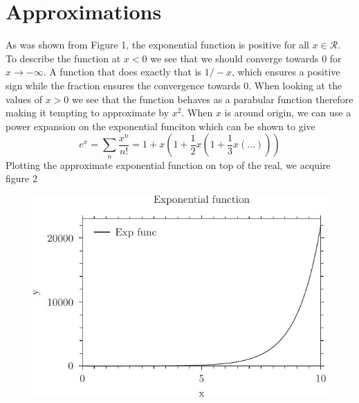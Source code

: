 \documentclass{article}
\begin{document}
\section{Approximations}
As was shown from Figure 1, the exponential function is positive for all $x\in \mathcal{R}$. To describe the function at $x<0$ we see that we should converge towards 0 for $x\rightarrow -\infty$. A function that does exactly that is $1/-x$, which ensures a positive sign while the fraction ensures the convergence towards 0. \newline
When looking at the values of $x>0$ we see that the function behaves as a parabular function therefore making it tempting to approximate by $x^2$.
\newline
When $x$ is around origin, we can use a power expansion on the exponential funciton which can be shown to give
\begin{equation}
	e^x=\sum_n \frac{x^n}{n!}=1+x\left(1+\frac12 x\left(1+\frac13 x\left(...\right)\right)\right)
\end{equation}
Plotting the approximate exponential function on top of the real, we acquire figure 2
\begin{figure}
	\includegraphics{fig-pyxplot.pdf}
\end{figure}
\end{document}
